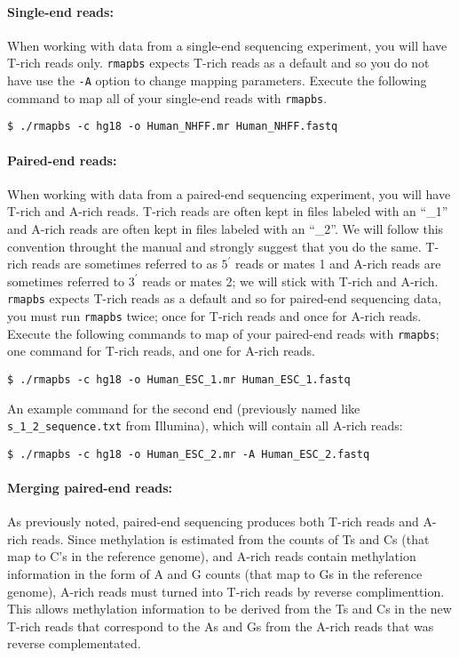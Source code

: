 \documentclass[10pt]{article}
\newcommand{\prog}[1]{\texttt{#1}}
\newcommand{\fn}[1]{\texttt{#1}}
\newcommand{\op}[1]{\texttt{#1}}
\begin{document}
\paragraph{Single-end reads:}
When working with data from a single-end sequencing experiment, you
will have T-rich reads only. \prog{rmapbs} expects T-rich reads as a
default and so you do not have use the \op{-A} option to change mapping
parameters. Execute the following command to map all of your
single-end reads with \prog{rmapbs}.
\begin{verbatim}
$ ./rmapbs -c hg18 -o Human_NHFF.mr Human_NHFF.fastq
\end{verbatim}

\paragraph{Paired-end reads:}
When working with data from a paired-end sequencing experiment, you
will have T-rich and A-rich reads. T-rich reads are often kept in
files labeled with an ``\_1'' and A-rich reads are often kept in files
labeled with an ``\_2''. We will follow this convention throught the
manual and strongly suggest that you do the same. T-rich reads are
sometimes referred to as $5^{\prime}$ reads or mates 1 and A-rich
reads are sometimes referred to $3^{\prime}$ reads or mates 2; we will
stick with T-rich and A-rich. \prog{rmapbs} expects T-rich reads as a
default and so for paired-end sequencing data, you must run
\prog{rmapbs} twice; once for T-rich reads and once for A-rich
reads. Execute the following commands to map of your paired-end reads
with \prog{rmapbs}; one command for T-rich reads, and one for A-rich
reads.
\begin{verbatim}
$ ./rmapbs -c hg18 -o Human_ESC_1.mr Human_ESC_1.fastq
\end{verbatim}
An example command for the second end (previously named like
\fn{s\_1\_2\_sequence.txt} from Illumina), which will contain all
A-rich reads:
\begin{verbatim}
$ ./rmapbs -c hg18 -o Human_ESC_2.mr -A Human_ESC_2.fastq
\end{verbatim}

\paragraph{Merging paired-end reads:}
As previously noted, paired-end sequencing produces both T-rich reads
and A-rich reads. Since methylation is estimated from the counts of Ts
and Cs (that map to C's in the reference genome), and A-rich reads
contain methylation information in the form of A and G counts (that
map to Gs in the reference genome), A-rich reads must turned into
T-rich reads by reverse complimenttion. This allows methylation
information to be derived from the Ts and Cs in the new T-rich reads
that correspond to the As and Gs from the A-rich reads that was
reverse complementated.
\end{document}
